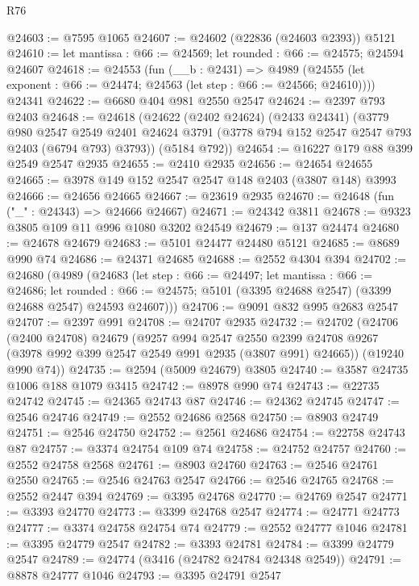 \begin{lexlean}{R76}
\begin{coremodule}
@24603 := @7595 @1065
@24607 := @24602 (@22836 (@24603 @2393)) @5121
@24610 := let mantissa : @66 := @24569; let rounded : @66 := @24575; @24594 @24607
@24618 := @24553
    (fun (__b : @2431) =>
    @4989 (@24555 (let exponent : @66 := @24474; @24563 (let step : @66 := @24566; @24610))))
    @24341
@24622 := @6680 @404 @981 @2550 @2547
@24624 := @2397 @793 @2403
@24648 := @24618
    (@24622
      (@2402 @24624)
      (@2433 @24341)
      (@3779
        @980
        @2547
        @2549
        @2401
        @24624
        @3791
        (@3778 @794 @152 @2547 @2547 @793 @2403 (@6794 @793) @3793))
      (@5184 @792))
@24654 := @16227 @179 @88 @399 @2549 @2547 @2935
@24655 := @2410 @2935
@24656 := @24654 @24655
@24665 := @3978 @149 @152 @2547 @2547 @148 @2403 (@3807 @148) @3993
@24666 := @24656 @24665
@24667 := @23619 @2935
@24670 := @24648 (fun ("_" : @24343) => @24666 @24667)
@24671 := @24342 @3811
@24678 := @9323 @3805 @109 @11 @996 @1080 @3202 @24549
@24679 := @137 @24474
@24680 := @24678 @24679
@24683 := @5101 @24477 @24480 @5121
@24685 := @8689 @990 @74
@24686 := @24371 @24685
@24688 := @2552 @4304 @394
@24702 := @24680
    (@4989
      (@24683
        (let step : @66 := @24497;
        let mantissa : @66 := @24686;
        let rounded : @66 := @24575;
        @5101 (@3395 @24688 @2547) (@3399 @24688 @2547) @24593 @24607)))
@24706 := @9091 @832 @995 @2683 @2547
@24707 := @2397 @991
@24708 := @24707 @2935
@24732 := @24702
    (@24706
      (@2400 @24708)
      @24679
      (@9257
        @994
        @2547
        @2550
        @2399
        @24708
        @9267
        (@3978 @992 @399 @2547 @2549 @991 @2935 (@3807 @991) @24665))
      (@19240 @990 @74))
@24735 := @2594 (@5009 @24679) @3805
@24740 := @3587 @24735 @1006 @188 @1079 @3415
@24742 := @8978 @990 @74
@24743 := @22735 @24742
@24745 := @24365 @24743 @87
@24746 := @24362 @24745
@24747 := @2546 @24746
@24749 := @2552 @24686 @2568
@24750 := @8903 @24749
@24751 := @2546 @24750
@24752 := @2561 @24686
@24754 := @22758 @24743 @87
@24757 := @3374 @24754 @109 @74
@24758 := @24752 @24757
@24760 := @2552 @24758 @2568
@24761 := @8903 @24760
@24763 := @2546 @24761 @2550
@24765 := @2546 @24763 @2547
@24766 := @2546 @24765
@24768 := @2552 @2447 @394
@24769 := @3395 @24768
@24770 := @24769 @2547
@24771 := @3393 @24770
@24773 := @3399 @24768 @2547
@24774 := @24771 @24773
@24777 := @3374 @24758 @24754 @74
@24779 := @2552 @24777 @1046
@24781 := @3395 @24779 @2547
@24782 := @3393 @24781
@24784 := @3399 @24779 @2547
@24789 := @24774 (@3416 (@24782 @24784 @24348 @2549))
@24791 := @8878 @24777 @1046
@24793 := @3395 @24791 @2547

\end{coremodule}
\end{lexlean}
